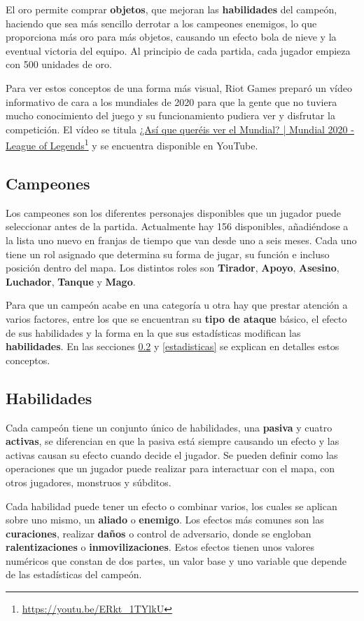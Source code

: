 El oro permite comprar \textbf{objetos}, que mejoran las \textbf{habilidades} del campeón, haciendo que sea más sencillo derrotar a los campeones enemigos, lo que proporciona más oro para más objetos, causando un efecto bola de nieve y la eventual victoria del equipo. Al principio de cada partida, cada jugador empieza con 500 unidades de oro.

Para ver estos conceptos de una forma más visual, Riot Games preparó un vídeo informativo de cara a los mundiales de 2020 para que la gente que no tuviera mucho conocimiento del juego y su funcionamiento pudiera ver y disfrutar la competición. El vídeo se titula \href{https://www.youtube.com/watch?v=ERkt_1TYlkU}{¿Así que queréis ver el Mundial? | Mundial 2020 - League of Legends}\footnote{\url{https://youtu.be/ERkt_1TYlkU}} y se encuentra disponible en YouTube.


\subsection{Campeones}
Los campeones son los diferentes personajes disponibles que un jugador puede seleccionar antes de la partida. Actualmente hay 156 disponibles, añadiéndose a la lista uno nuevo en franjas de tiempo que van desde uno a seis meses. Cada uno tiene un rol asignado que determina su forma de jugar, su función e incluso posición dentro del mapa. Los distintos roles son \textbf{Tirador}, \textbf{Apoyo}, \textbf{Asesino}, \textbf{Luchador}, \textbf{Tanque} y \textbf{Mago}.

Para que un campeón acabe en una categoría u otra hay que prestar atención a varios factores, entre los que se encuentran su \textbf{tipo de ataque} básico, el efecto de sus habilidades y la forma en la que sus estadísticas modifican las \textbf{habilidades}. En las secciones \ref{habilidades} y \ref{estadisticas} se explican en detalles estos conceptos.

\subsection{Habilidades}
\label{habilidades}
Cada campeón tiene un conjunto único de habilidades, una \textbf{pasiva} y cuatro \textbf{activas}, se diferencian en que la pasiva está siempre causando un efecto y las activas causan su efecto cuando decide el jugador. Se pueden definir como las operaciones que un jugador puede realizar para interactuar con el mapa, con otros jugadores, monstruos y súbditos.

Cada habilidad puede tener un efecto o combinar varios, los cuales se aplican sobre uno mismo, un \textbf{aliado} o \textbf{enemigo}. Los efectos más comunes son las \textbf{curaciones}, realizar \textbf{daños} o control de adversario, donde se engloban \textbf{ralentizaciones} o \textbf{inmovilizaciones}. Estos efectos tienen unos valores numéricos que constan de dos partes, un valor base y uno variable que depende de las estadísticas del campeón.

